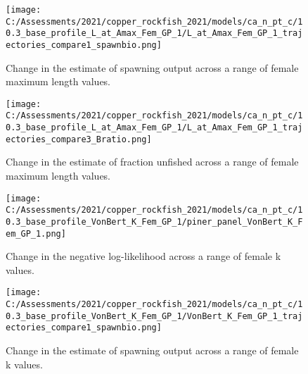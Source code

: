 \documentclass[11pt,
  english,
  a4paper,
]{article}
\begin{document}
\tagmcend\tagstructend


\begin{figure}
\centering
\texttt{[image: C:/Assessments/2021/copper\_rockfish\_2021/models/ca\_n\_pt\_c/10.3\_base\_profile\_L\_at\_Amax\_Fem\_GP\_1/L\_at\_Amax\_Fem\_GP\_1\_trajectories\_compare1\_spawnbio.png]}
\caption{Change in the estimate of spawning output across a range of female maximum length values.\label{fig:linf-ssb}}
\end{figure}

\tagmcend\tagstructend


\begin{figure}
\centering
\texttt{[image: C:/Assessments/2021/copper\_rockfish\_2021/models/ca\_n\_pt\_c/10.3\_base\_profile\_L\_at\_Amax\_Fem\_GP\_1/L\_at\_Amax\_Fem\_GP\_1\_trajectories\_compare3\_Bratio.png]}
\caption{Change in the estimate of fraction unfished across a range of female maximum length values.\label{fig:linf-depl}}
\end{figure}

\tagmcend\tagstructend


\begin{figure}
\centering
\texttt{[image: C:/Assessments/2021/copper\_rockfish\_2021/models/ca\_n\_pt\_c/10.3\_base\_profile\_VonBert\_K\_Fem\_GP\_1/piner\_panel\_VonBert\_K\_Fem\_GP\_1.png]}
\caption{Change in the negative log-likelihood across a range of female k values.\label{fig:k-profile}}
\end{figure}

\tagmcend\tagstructend


\begin{figure}
\centering
\texttt{[image: C:/Assessments/2021/copper\_rockfish\_2021/models/ca\_n\_pt\_c/10.3\_base\_profile\_VonBert\_K\_Fem\_GP\_1/VonBert\_K\_Fem\_GP\_1\_trajectories\_compare1\_spawnbio.png]}
\caption{Change in the estimate of spawning output across a range of female k values.\label{fig:k-ssb}}
\end{figure}
\end{document}
